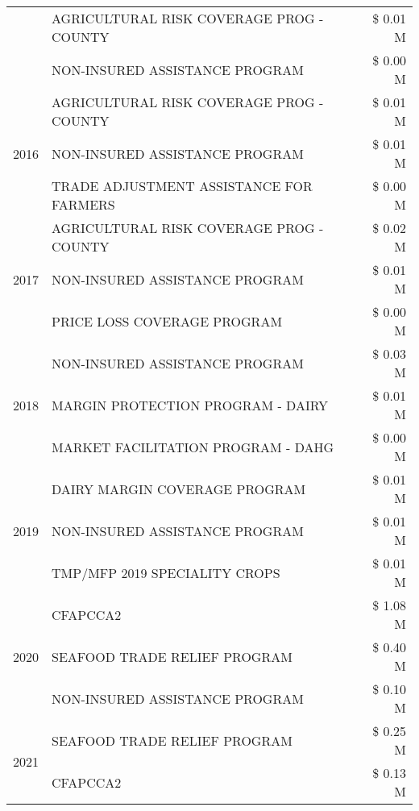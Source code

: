 \begin{tabular}{llr}
 & AGRICULTURAL RISK COVERAGE PROG - COUNTY & \$ 0.01 M \\
 & NON-INSURED ASSISTANCE PROGRAM & \$ 0.00 M \\
\cline{1-3}
\multirow[t]{3}{*}{2016} & AGRICULTURAL RISK COVERAGE PROG - COUNTY & \$ 0.01 M \\
 & NON-INSURED ASSISTANCE PROGRAM & \$ 0.01 M \\
 & TRADE ADJUSTMENT ASSISTANCE FOR FARMERS & \$ 0.00 M \\
\cline{1-3}
\multirow[t]{3}{*}{2017} & AGRICULTURAL RISK COVERAGE PROG - COUNTY & \$ 0.02 M \\
 & NON-INSURED ASSISTANCE PROGRAM & \$ 0.01 M \\
 & PRICE LOSS COVERAGE PROGRAM & \$ 0.00 M \\
\cline{1-3}
\multirow[t]{3}{*}{2018} & NON-INSURED ASSISTANCE PROGRAM & \$ 0.03 M \\
 & MARGIN PROTECTION PROGRAM - DAIRY & \$ 0.01 M \\
 & MARKET FACILITATION PROGRAM - DAHG & \$ 0.00 M \\
\cline{1-3}
\multirow[t]{3}{*}{2019} & DAIRY MARGIN COVERAGE PROGRAM & \$ 0.01 M \\
 & NON-INSURED ASSISTANCE PROGRAM & \$ 0.01 M \\
 & TMP/MFP 2019 SPECIALITY CROPS & \$ 0.01 M \\
\cline{1-3}
\multirow[t]{3}{*}{2020} & CFAPCCA2 & \$ 1.08 M \\
 & SEAFOOD TRADE RELIEF PROGRAM & \$ 0.40 M \\
 & NON-INSURED ASSISTANCE PROGRAM & \$ 0.10 M \\
\cline{1-3}
\multirow[t]{2}{*}{2021} & SEAFOOD TRADE RELIEF PROGRAM & \$ 0.25 M \\
 & CFAPCCA2 & \$ 0.13 M \\
\cline{1-3}
\bottomrule
\end{tabular}
